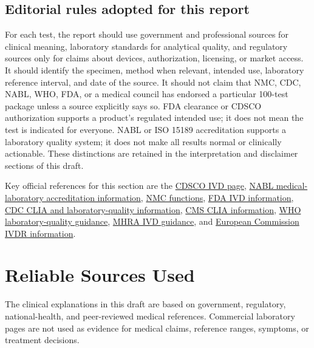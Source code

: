 \documentclass[11pt,openany]{book}
\begin{document}
\subsection*{Editorial rules adopted for this report}

For each test, the report should use government and professional sources for
clinical meaning, laboratory standards for analytical quality, and regulatory
sources only for claims about devices, authorization, licensing, or market
access. It should identify the specimen, method when relevant, intended use,
laboratory reference interval, and date of the source. It should not claim that
NMC, CDC, NABL, WHO, FDA, or a medical council has endorsed a particular
100-test package unless a source explicitly says so. FDA clearance or CDSCO
authorization supports a product's regulated intended use; it does not mean the
test is indicated for everyone. NABL or ISO 15189 accreditation supports a
laboratory quality system; it does not make all results normal or clinically
actionable. These distinctions are retained in the interpretation and
disclaimer sections of this draft.

Key official references for this section are the
\href{https://www.cdsco.gov.in/opencms/opencms/en/Medical-Device-Diagnostics/InVitro-Diagnostics/}{CDSCO IVD page},
\href{https://nabl-india.org/}{NABL medical-laboratory accreditation information},
\href{https://www.nmc.org.in/about-nmc/functions-of-nmc/}{NMC functions},
\href{https://www.fda.gov/medical-devices/products-and-medical-procedures/in-vitro-diagnostics}{FDA IVD information},
\href{https://www.cdc.gov/clia/index.html}{CDC CLIA and laboratory-quality information},
\href{https://www.cms.gov/medicare/quality/clinical-laboratory-improvement-amendments}{CMS CLIA information},
\href{https://www.who.int/teams/regulation-prequalification/quality-assurance-of-in-vitro-diagnostics}{WHO laboratory-quality guidance},
\href{https://www.gov.uk/government/publications/in-vitro-diagnostic-medical-devices-guidance-on-legislation}{MHRA IVD guidance},
and \href{https://health.ec.europa.eu/medical-devices-vitro-diagnostics_en}{European Commission IVDR information}.

\section{Reliable Sources Used}

The clinical explanations in this draft are based on government, regulatory,
national-health, and peer-reviewed medical references. Commercial laboratory
pages are not used as evidence for medical claims, reference ranges, symptoms,
or treatment decisions.
\end{document}
